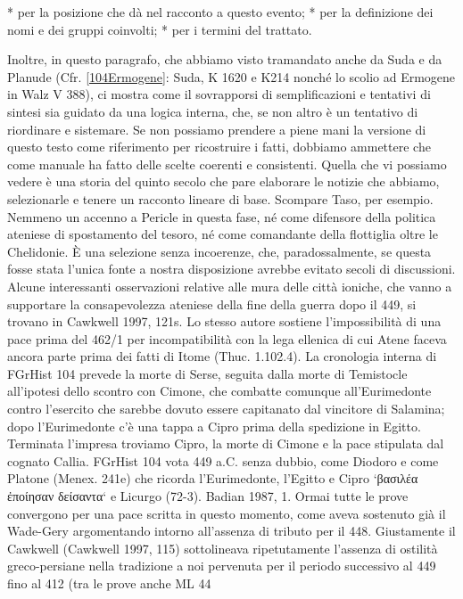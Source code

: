 {*  per la posizione che dà nel racconto a questo evento;
*  per la definizione dei nomi e dei gruppi coinvolti;
*  per i termini del trattato. 

Inoltre, in questo paragrafo, che abbiamo visto tramandato anche da Suda e da Planude (Cfr. \ref{104Ermogene}: Suda, K 1620 e K214 nonché lo scolio ad Ermogene in Walz V 388), ci mostra come il sovrapporsi di semplificazioni e tentativi di sintesi sia guidato da una logica interna, che, se non altro è un tentativo di riordinare e sistemare. Se non possiamo prendere a piene mani la versione di questo testo come riferimento per ricostruire i fatti, dobbiamo ammettere che come manuale ha fatto delle scelte coerenti e consistenti. Quella che vi possiamo vedere è una storia del quinto secolo che pare elaborare le notizie che abbiamo, selezionarle e tenere un racconto lineare di base. Scompare Taso, per esempio. Nemmeno un accenno a Pericle  in questa fase, né come difensore della politica ateniese di spostamento del tesoro, né come comandante della flottiglia oltre le Chelidonie. È una selezione senza incoerenze, che, paradossalmente, se questa fosse stata l'unica fonte a nostra disposizione avrebbe evitato secoli di discussioni. Alcune interessanti osservazioni relative alle mura delle città ioniche, che vanno a supportare la consapevolezza ateniese della fine della guerra dopo il 449, si trovano in Cawkwell 1997, 121s. Lo stesso autore sostiene l'impossibilità di una pace prima del 462/1 per incompatibilità con la lega ellenica di cui Atene faceva ancora parte prima dei fatti di Itome (Thuc. 1.102.4).  La cronologia interna di FGrHist 104 prevede la morte di Serse, seguita dalla morte di Temistocle all'ipotesi dello scontro con Cimone, che combatte comunque all'Eurimedonte contro l'esercito che sarebbe dovuto essere capitanato dal vincitore di Salamina; dopo l'Eurimedonte c'è una tappa a Cipro prima della spedizione in Egitto. Terminata l'impresa troviamo Cipro, la morte di  Cimone e la pace stipulata dal cognato Callia. FGrHist 104 vota 449 a.C. senza dubbio, come  Diodoro e come Platone (Menex. 241e) che ricorda l'Eurimedonte, l'Egitto e Cipro `βασιλέα ἐποίησαν δείσαντα` e Licurgo  (72-3). Badian 1987, 1.  Ormai tutte le prove convergono per una pace scritta in questo momento, come aveva sostenuto già il Wade-Gery argomentando intorno all'assenza di tributo per il 448. Giustamente il Cawkwell (Cawkwell 1997, 115) sottolineava ripetutamente l'assenza di ostilità greco-persiane nella tradizione a noi pervenuta per il periodo successivo al 449 fino al 412 (tra le prove anche ML 44 
}
